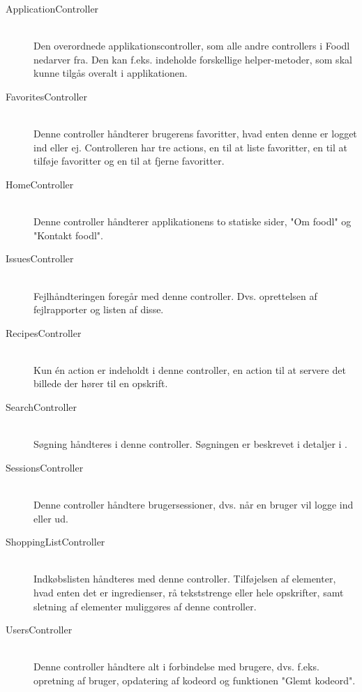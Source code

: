 \begin{description}
  \item[ApplicationController] \hfill \\ 
  Den overordnede applikationscontroller, som alle andre controllers i Foodl nedarver fra. Den kan f.eks. indeholde forskellige helper-metoder, som skal kunne tilgås overalt i applikationen.

  \item[FavoritesController] \hfill \\ 
  Denne controller håndterer brugerens favoritter, hvad enten denne er logget ind eller ej. Controlleren har tre actions, en til at liste favoritter, en til at tilføje favoritter og en til at fjerne favoritter.

  \item[HomeController] \hfill \\ 
  Denne controller håndterer applikationens to statiske sider, "Om foodl" og "Kontakt foodl".

  \item[IssuesController] \hfill \\ 
  Fejlhåndteringen foregår med denne controller. Dvs. oprettelsen af fejlrapporter og listen af disse.

  \item[RecipesController] \hfill \\
  Kun én action er indeholdt i denne controller, en action til at servere det billede der hører til en opskrift.

  \item[SearchController] \hfill \\
  Søgning håndteres i denne controller. Søgningen er beskrevet i detaljer i .

  \item[SessionsController] \hfill \\
  Denne controller håndtere brugersessioner, dvs. når en bruger vil logge ind eller ud.

  \item[ShoppingListController] \hfill \\
  Indkøbslisten håndteres med denne controller. Tilføjelsen af elementer, hvad enten det er ingredienser, rå tekststrenge eller hele opskrifter, samt sletning af elementer muliggøres af denne controller.

  \item[UsersController] \hfill \\
  Denne controller håndtere alt i forbindelse med brugere, dvs. f.eks. opretning af bruger, opdatering af kodeord og funktionen "Glemt kodeord".

\end{description}

